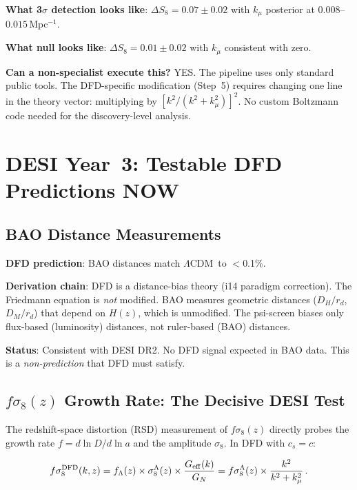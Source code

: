 \documentclass[11pt,a4paper]{article}
\newcommand{\LCDM}{$\Lambda$CDM}
\newcommand{\kmu}{k_\mu}
\newcommand{\Geff}{G_{\rm eff}}
\begin{document}
\begin{pipelinebox}
\textbf{What 3$\sigma$ detection looks like}:
$\Delta S_8 = 0.07 \pm 0.02$ with $\kmu$ posterior at $0.008$--$0.015$\,Mpc$^{-1}$.

\textbf{What null looks like}:
$\Delta S_8 = 0.01 \pm 0.02$ with $\kmu$ consistent with zero.

\textbf{Can a non-specialist execute this?} YES. The pipeline uses
only standard public tools. The DFD-specific modification (Step~5)
requires changing one line in the theory vector: multiplying by
$[k^2/(k^2 + \kmu^2)]^2$. No custom Boltzmann code needed for the
discovery-level analysis.

\end{pipelinebox}


\section{DESI Year~3: Testable DFD Predictions NOW}
\label{sec:desi}

\subsection{BAO Distance Measurements}

\textbf{DFD prediction}: BAO distances match \LCDM\ to $<$0.1\%.

\textbf{Derivation chain}: DFD is a distance-bias theory (i14
paradigm correction). The Friedmann equation is \emph{not} modified.
BAO measures geometric distances ($D_H/r_d$, $D_M/r_d$) that depend
on $H(z)$, which is unmodified. The psi-screen biases only flux-based
(luminosity) distances, not ruler-based (BAO) distances.

\textbf{Status}: Consistent with DESI DR2. No DFD signal expected
in BAO data. This is a \emph{non-prediction} that DFD must satisfy.

\subsection{$f\sigma_8(z)$ Growth Rate: The Decisive DESI Test}

The redshift-space distortion (RSD) measurement of $f\sigma_8(z)$
directly probes the growth rate $f = d\ln D/d\ln a$ and the amplitude
$\sigma_8$. In DFD with $c_s = c$:

\begin{equation}
f\sigma_8^{\rm DFD}(k,z) = f_\Lambda(z) \times \sigma_8^\Lambda(z)
  \times \frac{\Geff(k)}{G_N}
  = f\sigma_8^\Lambda(z) \times \frac{k^2}{k^2 + \kmu^2}\,.
\label{eq:fsigma8}
\end{equation}
\end{document}
